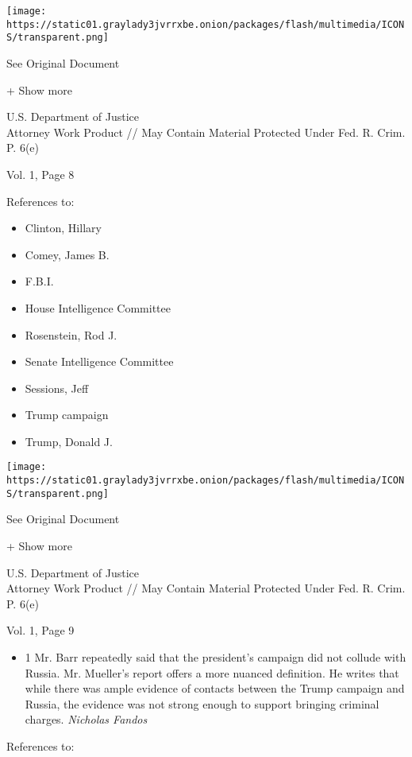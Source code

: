\protect\hyperlink{}{}

\texttt{[image: https://static01.graylady3jvrrxbe.onion/packages/flash/multimedia/ICONS/transparent.png]}

See Original Document

+ Show more

U.S. Department of Justice\\
Attorney Work Product // May Contain Material Protected Under Fed. R.
Crim. P. 6(e)

Vol. 1, Page 8

References to:

\begin{itemize}
\tightlist
\item
  Clinton, Hillary
\item
  Comey, James B.
\item
  F.B.I.
\item
  House Intelligence Committee
\item
  Rosenstein, Rod J.
\item
  Senate Intelligence Committee
\item
  Sessions, Jeff
\item
  Trump campaign
\item
  Trump, Donald J.
\end{itemize}

\protect\hyperlink{}{}

\texttt{[image: https://static01.graylady3jvrrxbe.onion/packages/flash/multimedia/ICONS/transparent.png]}

See Original Document

+ Show more

U.S. Department of Justice\\
Attorney Work Product // May Contain Material Protected Under Fed. R.
Crim. P. 6(e)

Vol. 1, Page 9

\begin{itemize}
\tightlist
\item
  1 Mr. Barr repeatedly said that the president's campaign did not
  collude with Russia. Mr. Mueller's report offers a more nuanced
  definition. He writes that while there was ample evidence of contacts
  between the Trump campaign and Russia, the evidence was not strong
  enough to support bringing criminal charges. \emph{Nicholas Fandos}
\end{itemize}

References to:

